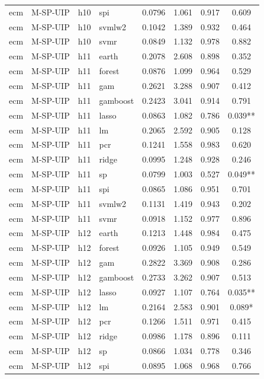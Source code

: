 \begin{ThreePartTable}
\begin{longtable}[t]{llclcccc}
ecm & M-SP-UIP & h10 & spi & 0.0796 & 1.061 & 0.917 & 0.609\\
ecm & M-SP-UIP & h10 & svmlw2 & 0.1042 & 1.389 & 0.932 & 0.464\\
ecm & M-SP-UIP & h10 & svmr & 0.0849 & 1.132 & 0.978 & 0.882\\
\addlinespace
ecm & M-SP-UIP & h11 & earth & 0.2078 & 2.608 & 0.898 & 0.352\\
ecm & M-SP-UIP & h11 & forest & 0.0876 & 1.099 & 0.964 & 0.529\\
ecm & M-SP-UIP & h11 & gam & 0.2621 & 3.288 & 0.907 & 0.412\\
ecm & M-SP-UIP & h11 & gamboost & 0.2423 & 3.041 & 0.914 & 0.791\\
ecm & M-SP-UIP & h11 & lasso & 0.0863 & 1.082 & 0.786 & 0.039**\\
ecm & M-SP-UIP & h11 & lm & 0.2065 & 2.592 & 0.905 & 0.128\\
ecm & M-SP-UIP & h11 & pcr & 0.1241 & 1.558 & 0.983 & 0.620\\
ecm & M-SP-UIP & h11 & ridge & 0.0995 & 1.248 & 0.928 & 0.246\\
ecm & M-SP-UIP & h11 & sp & 0.0799 & 1.003 & 0.527 & 0.049**\\
ecm & M-SP-UIP & h11 & spi & 0.0865 & 1.086 & 0.951 & 0.701\\
ecm & M-SP-UIP & h11 & svmlw2 & 0.1131 & 1.419 & 0.943 & 0.202\\
ecm & M-SP-UIP & h11 & svmr & 0.0918 & 1.152 & 0.977 & 0.896\\
\addlinespace
ecm & M-SP-UIP & h12 & earth & 0.1213 & 1.448 & 0.984 & 0.475\\
ecm & M-SP-UIP & h12 & forest & 0.0926 & 1.105 & 0.949 & 0.549\\
ecm & M-SP-UIP & h12 & gam & 0.2822 & 3.369 & 0.908 & 0.286\\
ecm & M-SP-UIP & h12 & gamboost & 0.2733 & 3.262 & 0.907 & 0.513\\
ecm & M-SP-UIP & h12 & lasso & 0.0927 & 1.107 & 0.764 & 0.035**\\
ecm & M-SP-UIP & h12 & lm & 0.2164 & 2.583 & 0.901 & 0.089*\\
ecm & M-SP-UIP & h12 & pcr & 0.1266 & 1.511 & 0.971 & 0.415\\
ecm & M-SP-UIP & h12 & ridge & 0.0986 & 1.178 & 0.896 & 0.111\\
ecm & M-SP-UIP & h12 & sp & 0.0866 & 1.034 & 0.778 & 0.346\\
ecm & M-SP-UIP & h12 & spi & 0.0895 & 1.068 & 0.968 & 0.766\\

\end{longtable}
\end{ThreePartTable}

